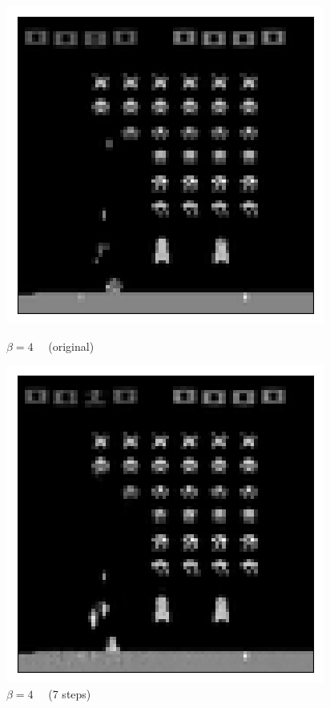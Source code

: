 \begin{figure}[h!]
\begin{multicols}{4}
    \includegraphics[scale=0.4]{figures/results/weighted_average/beta_4_posterior_sample_original.png}
    \caption{$\beta=4\quad$ (original)}
    \includegraphics[scale=0.4]{figures/results/weighted_average/beta_4_posterior_sample_7.png}
    \caption{$\beta=4\quad$ (7 steps)}

\end{multicols}
\end{figure}
